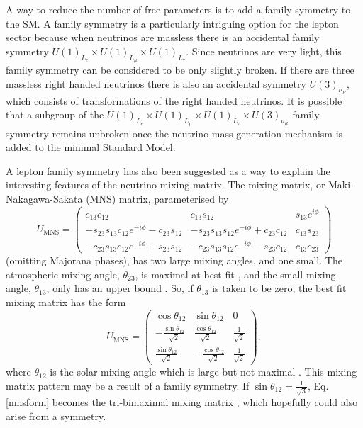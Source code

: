 \documentclass[nofootinbib,showpacs]{revtex4}
\begin{document}
A way to reduce the number of free parameters is to add a family symmetry to the SM. A family symmetry is a particularly intriguing option for the lepton sector because when neutrinos are massless there is an accidental family symmetry $U(1)_{L_e}\times U(1)_{L_\mu}\times U(1)_{L_\tau}$. Since neutrinos are very light, this family symmetry can be considered to be only slightly broken. If there are three massless right handed neutrinos there is also an accidental symmetry $U(3)_{\nu_R}$, which consists of transformations of the right handed neutrinos. It is possible that a subgroup of the $U(1)_{L_e}\times U(1)_{L_\mu}\times U(1)_{L_\tau}\times U(3)_{\nu_R}$ family symmetry remains unbroken once the neutrino mass generation mechanism is added to the minimal Standard Model.

A lepton family symmetry has also been suggested as a way to explain the interesting features of the neutrino mixing matrix.
The mixing matrix, or Maki-Nakagawa-Sakata (MNS) matrix, parameterised by
\begin{equation}
U_\mathrm{MNS}=
\left(\begin{array}{ccc} c_{13} c_{12} & c_{13} s_{12} & s_{13} e^{i \phi} \\ 
-s_{23} s_{13} c_{12}e^{-i \phi}- c_{23} s_{12} & -s_{23} s_{13} s_{12}e^{-i \phi}+ c_{23} c_{12} & c_{13} s_{23} \\
-c_{23} s_{13} c_{12}e^{-i \phi}+ s_{23} s_{12} & -c_{23} s_{13} s_{12}e^{-i \phi}- s_{23} c_{12} & c_{13} c_{23}
\end{array}\right)
\end{equation}
(omitting Majorana phases), has two large mixing angles, and one small. The atmospheric mixing angle, $\theta_{23}$, is maximal at best fit \cite{SKatm2,KAMatm,IMBatm,Soudanatmnew,MACROatm}, and the small mixing angle, $\theta_{13}$, only has an upper bound \cite{CHOOZ}. So, if $\theta_{13}$ is taken to be zero, the best fit mixing matrix has the form
\begin{equation}\label{mnsform}
U_\mathrm{MNS}=\left(\begin{array}{ccc} 
\cos \theta_{12} & \sin \theta_{12} & 0 \\
-\frac{\sin \theta_{12}}{\sqrt{2}}&\frac{\cos \theta_{12}}{\sqrt{2}}&\frac{1}{\sqrt{2}}\\
\frac{\sin \theta_{12}}{\sqrt{2}}&-\frac{\cos \theta_{12}}{\sqrt{2}}&\frac{1}{\sqrt{2}}\end{array}\right),
\end{equation}
where $\theta_{12}$ is the solar mixing angle which is large but not maximal \cite{SNOsolnew,K2Ksol,SKsol2,SAGEsol,HOMESTAKEsol,GALLEXsol,GNOsol}. This mixing matrix pattern may be a result of a family symmetry. If $\sin\theta_{12}=\frac{1}{\sqrt{3}}$, Eq. \ref{mnsform} becomes the tri-bimaximal mixing matrix \cite{hps1,zeehe1}, which hopefully could also arise from a symmetry.
\end{document}
